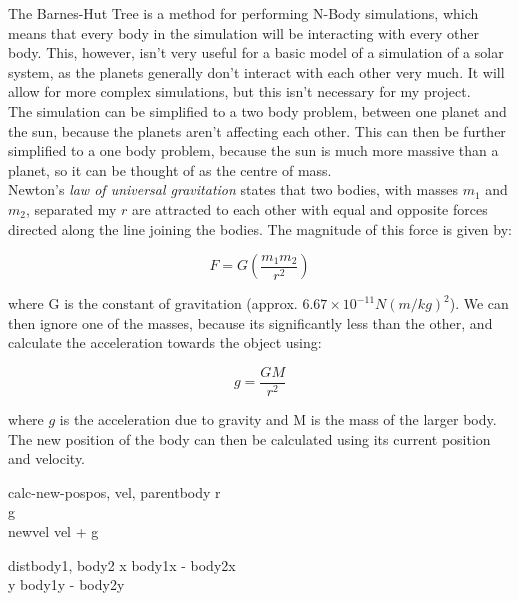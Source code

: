 The Barnes-Hut Tree is a method for performing N-Body simulations, which means
that every body in the simulation will be interacting with every other body.
This, however, isn't very useful for a basic model of a simulation of a solar
system, as the planets generally don't interact with each other very much. It
will allow for more complex simulations, but this isn't necessary for my
project. \\

The simulation can be simplified to a two body problem, between one planet and
the sun, because the planets aren't affecting each other. This can then be
further simplified to a one body problem, because the sun is much more massive
than a planet, so it can be thought of as the centre of mass. \\

Newton's \emph{law of universal gravitation} states that two bodies, with masses
$m_1$ and $m_2$, separated my $r$ are attracted to each other with equal and
opposite forces directed along the line joining the bodies. The magnitude of
this force is given by:

\begin{equation}
	F = G (\frac{m_1 m_2}{r^2})	
\end{equation}

where G is the constant of gravitation (approx. $6.67 \times 10^{-11}
N(m/kg)^2$). We can then ignore one of the masses, because its significantly
less than the other, and calculate the acceleration towards the object using:

\begin{equation}
	g = \frac{GM}{r^2}
\end{equation}

where $g$ is the acceleration due to gravity and M is the mass of the larger
body. The new position of the body can then be calculated using its current
position and velocity.

\begin{pseudocode}{calc-new-pos}{pos, vel, parentbody}
	r \GETS {}	 \\
	g \GETS {} \\
	newvel \GETS vel + g \\
\end{pseudocode}

\begin{pseudocode}{dist}{body1, body2}
	x \GETS \lvert body1x - body2x \lvert \\
	y \GETS \lvert body1y - body2y \lvert \\
\end{pseudocode}

